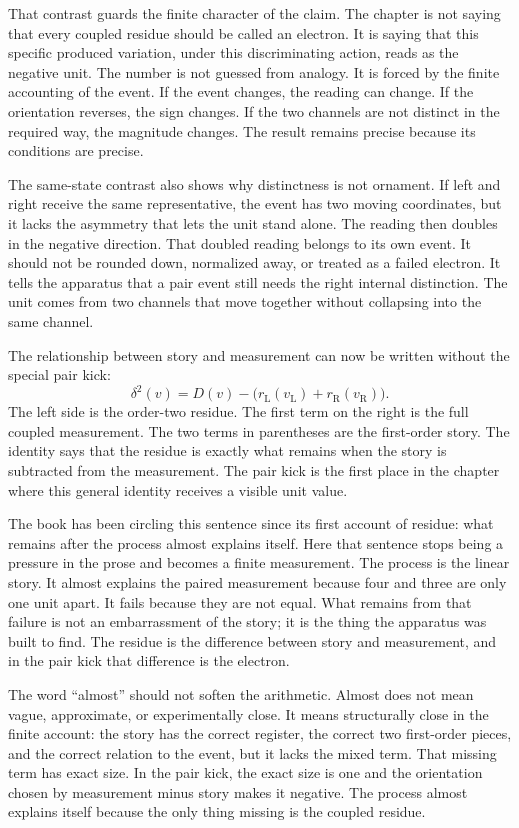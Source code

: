 That contrast guards the finite character of the claim. The chapter is not
saying that every coupled residue should be called an electron. It is saying
that this specific produced variation, under this discriminating action, reads
as the negative unit. The number is not guessed from analogy. It is forced by
the finite accounting of the event. If the event changes, the reading can
change. If the orientation reverses, the sign changes. If the two channels are
not distinct in the required way, the magnitude changes. The result remains
precise because its conditions are precise.

The same-state contrast also shows why distinctness is not ornament. If left
and right receive the same representative, the event has two moving
coordinates, but it lacks the asymmetry that lets the unit stand alone. The
reading then doubles in the negative direction. That doubled reading belongs
to its own event. It should not be rounded down, normalized away, or treated as
a failed electron. It tells the apparatus that a pair event still needs the
right internal distinction. The unit comes from two channels that move together
without collapsing into the same channel.

The relationship between story and measurement can now be written without the
special pair kick:
\[
  \delta^2(v)
    = D(v)
      - \big(r_{\mathrm{L}}(v_{\mathrm{L}})
             + r_{\mathrm{R}}(v_{\mathrm{R}})\big).
\]
The left side is the order-two residue. The first term on the right is the full
coupled measurement. The two terms in parentheses are the first-order story.
The identity says that the residue is exactly what remains when the story is
subtracted from the measurement. The pair kick is the first place in the
chapter where this general identity receives a visible unit value.

The book has been circling this sentence since its first account of residue:
what remains after the process almost explains itself. Here that sentence
stops being a pressure in the prose and becomes a finite measurement. The
process is the linear story. It almost explains the paired measurement because
four and three are only one unit apart. It fails because they are not equal.
What remains from that failure is not an embarrassment of the story; it is the
thing the apparatus was built to find. The residue is the difference between
story and measurement, and in the pair kick that difference is the electron.

The word ``almost'' should not soften the arithmetic. Almost does not mean
vague, approximate, or experimentally close. It means structurally close in the
finite account: the story has the correct register, the correct two
first-order pieces, and the correct relation to the event, but it lacks the
mixed term. That missing term has exact size. In the pair kick, the exact size
is one and the orientation chosen by measurement minus story makes it
negative. The process almost explains itself because the only thing missing is
the coupled residue.

